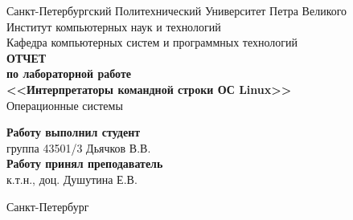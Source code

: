 \begin{titlepage}
\begin{center}
	Санкт-Петербургский Политехнический Университет Петра Великого\\[0.3cm]
	Институт компьютерных наук и технологий \\[0.3cm]
	Кафедра компьютерных систем и программных технологий\\[4cm]
	
	\textbf{ОТЧЕТ}\\ 
	\textbf{по лабораторной работе}\\[0.5cm]
	\textbf{<<Интерпретаторы командной строки ОС Linux>>}\\[0.1cm]
	Операционные системы\\[3.0cm]
\end{center}

\begin{flushright}
	\begin{minipage}{0.5\textwidth}
		\textbf{Работу выполнил студент}\\[3mm]
		группа 43501/3 \hfill Дьячков В.В.\\[5mm]
		\textbf{Работу принял преподаватель}\\[5mm]
		\sign[2cm] \hfill к.т.н., доц. Душутина Е.В. \\[5mm]
	\end{minipage}
\end{flushright}

\vfill

\begin{center}
	Санкт-Петербург\\[0.3cm]
	\the\year
\end{center}
\end{titlepage}

\addtocounter{page}{1}
